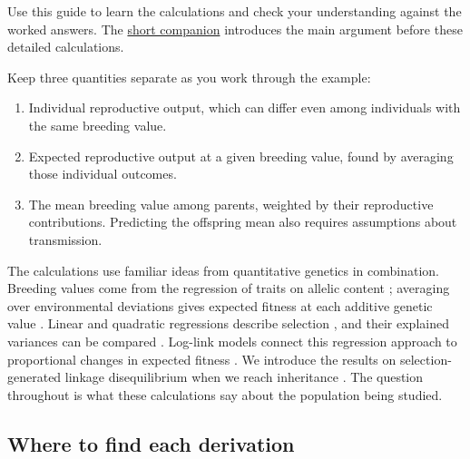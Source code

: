 \documentclass[11pt]{article}
\newcounter{answer}
\begin{document}
Use this guide to learn the calculations and check your understanding against the worked answers. The \href{../companion/companion.pdf}{short companion} introduces the main argument before these detailed calculations.

Keep three quantities separate as you work through the example:

\begin{enumerate}
\item Individual reproductive output, which can differ even among individuals with the same breeding value.
\item Expected reproductive output at a given breeding value, found by averaging those individual outcomes.
\item The mean breeding value among parents, weighted by their reproductive contributions. Predicting the offspring mean also requires assumptions about transmission.
\end{enumerate}

The calculations use familiar ideas from quantitative genetics in combination. Breeding values come from the regression of traits on allelic content \citep{Fisher1918,Fisher1941}; averaging over environmental deviations gives expected fitness at each additive genetic value \citep{Lande1979}. Linear and quadratic regressions describe selection \citep{LandeArnold1983}, and their explained variances can be compared \citep{MooradWade2013}. Log-link models connect this regression approach to proportional changes in expected fitness \citep{MorrisseyGoudie2022}. We introduce the results on selection-generated linkage disequilibrium when we reach inheritance \citep{Bulmer1971,BartonTurelli1991}. The question throughout is what these calculations say about the population being studied.

\subsection*{Where to find each derivation}
\end{document}

